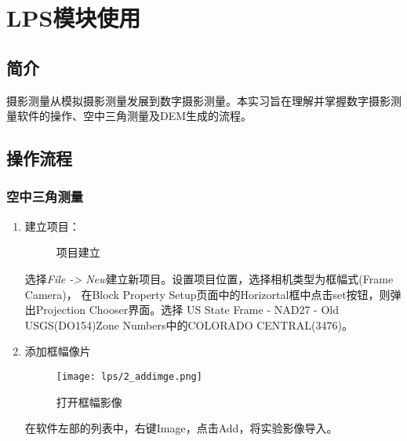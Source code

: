 
\section{LPS模块使用}
\subsection{简介}
    摄影测量从模拟摄影测量发展到数字摄影测量。本实习旨在理解并掌握数字摄影测量软件的操作、空中三角测量及DEM生成的流程。
\subsection{操作流程}
    \subsubsection{空中三角测量}
    \begin{enumerate}
        \item 建立项目：
        \begin{figure}[H]
            \centering
            \caption{项目建立}
        \end{figure}

        \hspace{20pt}选择\textit{File -> New}建立新项目。设置项目位置，选择相机类型为框幅式(Frame Camera)，
        在Block Property Setup页面中的Horizortal框中点击set按钮，则弹出Projection Chooser界面。选择
        US State Frame - NAD27 - Old USGS(DO154)Zone Numbers中的COLORADO CENTRAL(3476)。

        \item 添加框幅像片
        
        \begin{figure}[H] 
            \centering 
            \texttt{[image: lps/2\_addimge.png]}
            \caption{打开框幅影像}
        \end{figure}

        \hspace{20pt}在软件左部的列表中，右键Image，点击Add，将实验影像导入。


\end{enumerate}
